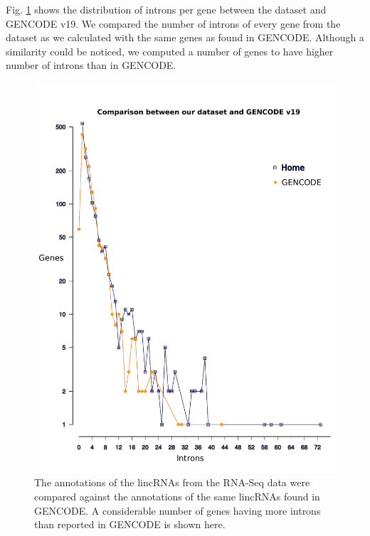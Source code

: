 \documentclass[ncrna,article,submit,moreauthors,pdftex,10pt,a4paper]{mdpi}
\begin{document}
Fig. \ref{comparison} shows the distribution of introns per gene between the dataset and GENCODE v19. We compared the number of introns of every gene from the dataset as we calculated with the same genes as found in GENCODE. Although a similarity could be noticed, we computed a number of genes to have higher number of introns than in GENCODE.
\clearpage
\begin{figure}[h]
 \centering
 \includegraphics[height = 12 cm, width=14 cm]{comparison_plot_2}
 \caption{The annotations of the lincRNAs from the RNA-Seq data were compared against the annotations of the same lincRNAs found in GENCODE. A considerable number of genes having more introns than reported in GENCODE is shown here.}
 \label{comparison}
\end{figure}



\end{document}
